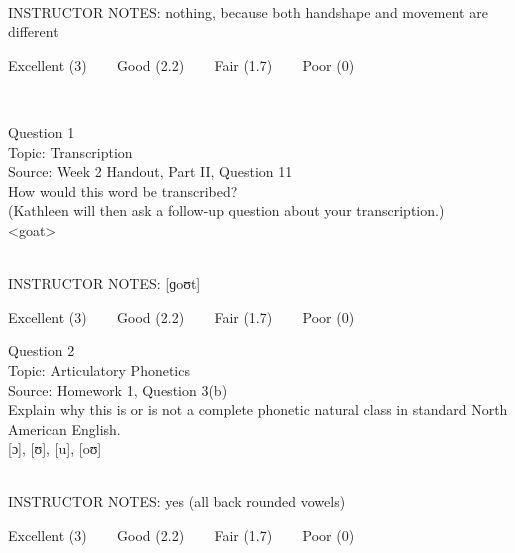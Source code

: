 \documentclass[12pt]{article}
\begin{document}
~\\
INSTRUCTOR NOTES: nothing, because both handshape and movement are different


\vfill
Excellent (3) ~~~ Good (2.2) ~~~ Fair (1.7) ~~~ Poor (0)
\newpage

\begin{center}
\textbf{{\color{red}{\HUGE END OF EXAM}}}\\

\end{center}
\newpage

\begin{center}
\textbf{{\color{blue}{\HUGE START OF EXAM\\}}}

\textbf{{\color{blue}{\HUGE Student ID: 12991\\}}}

\textbf{{\color{blue}{\HUGE \\}}}

\end{center}
\newpage

{\large Question 1}\\

Topic: Transcription\\
Source: Week 2 Handout, Part II, Question 11\\

How would this word be transcribed?\\ (Kathleen will then ask a follow-up question about your transcription.)\\

<goat>


~\\
INSTRUCTOR NOTES: [ɡoʊt]


\vfill
Excellent (3) ~~~ Good (2.2) ~~~ Fair (1.7) ~~~ Poor (0)
\newpage

{\large Question 2}\\

Topic: Articulatory Phonetics\\
Source: Homework 1, Question 3(b)\\

Explain why this is or is not a complete phonetic natural class in standard North American English.\\

{[ɔ]}, {[ʊ]}, {[u]}, {[oʊ]}


~\\
INSTRUCTOR NOTES: yes (all back rounded vowels)


\vfill
Excellent (3) ~~~ Good (2.2) ~~~ Fair (1.7) ~~~ Poor (0)
\newpage
\end{document}
